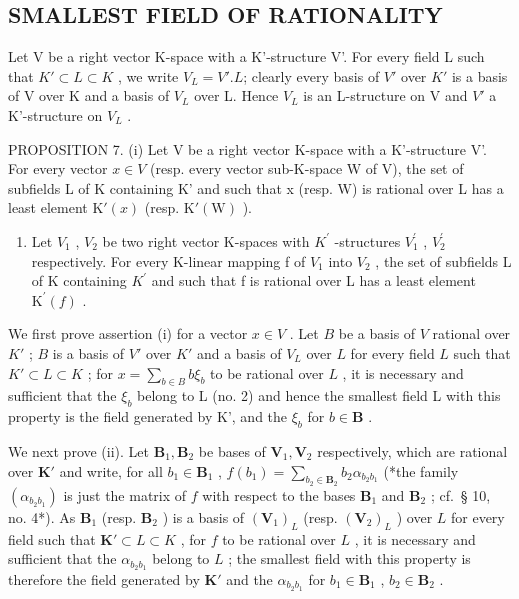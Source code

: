 \subsection{SMALLEST FIELD OF RATIONALITY}

Let V be a right vector K-space with a K'-structure V'. For every field L such that \(K' \subset L \subset K\) , we write \(V_{L} = V'. L\); clearly every basis of \(V'\) over \(K'\) is a basis of V over K and a basis of \(V_{L}\) over L. Hence \(V_{L}\) is an L-structure on V and \(V'\) a K'-structure on \(V_{L}\) .

PROPOSITION 7. (i) Let V be a right vector K-space with a K'-structure V'. For every vector \(x \in V\) (resp. every vector sub-K-space W of V), the set of subfields L of K containing K' and such that x (resp. W) is rational over L has a least element \(\mathrm{K}'(x)\) (resp. \(\mathrm{K}'(\mathrm{W})\) ).

\begin{enumerate}
\def\labelenumi{(\roman{enumi})}
\setcounter{enumi}{1}
\tightlist
\item
  Let \(V_{1}\) , \(V_{2}\) be two right vector K-spaces with \(K^{\prime}\) -structures \(V_{1}^{\prime}\) , \(V_{2}^{\prime}\) respectively. For every K-linear mapping f of \(V_{1}\) into \(V_{2}\) , the set of subfields L of K containing \(K^{\prime}\) and such that f is rational over L has a least element \(\mathrm{K}^{\prime}(f)\) .
\end{enumerate}

We first prove assertion (i) for a vector \(x \in V\) . Let \(B\) be a basis of \(V\) rational over \(K'\) ; \(B\) is a basis of \(V'\) over \(K'\) and a basis of \(V_L\) over \(L\) for every field \(L\) such that \(K' \subset L \subset K\) ; for \(x = \sum_{b \in B} b\xi_b\) to be rational over \(L\) , it is necessary and sufficient that the \(\xi_{b}\) belong to L (no. 2) and hence the smallest field L with this property is the field generated by K', and the \(\xi_{b}\) for \(b \in \mathbf{B}\) .

We next prove (ii). Let \(\mathbf{B}_1, \mathbf{B}_2\) be bases of \(\mathbf{V}_1, \mathbf{V}_2\) respectively, which are rational over \(\mathbf{K}'\) and write, for all \(b_1 \in \mathbf{B}_1\) , \(f(b_1) = \sum_{b_2 \in \mathbf{B}_2} b_2 \alpha_{b_2 b_1}\) (*the family \((\alpha_{b_2 b_1})\) is just the matrix of \(f\) with respect to the bases \(\mathbf{B}_1\) and \(\mathbf{B}_2\) ; cf.~§ 10, no. 4*). As \(\mathbf{B}_1\) (resp. \(\mathbf{B}_2\) ) is a basis of \((\mathbf{V}_1)_L\) (resp. \((\mathbf{V}_2)_L\) ) over \(L\) for every field such that \(\mathbf{K}' \subset L \subset K\) , for \(f\) to be rational over \(L\) , it is necessary and sufficient that the \(\alpha_{b_2 b_1}\) belong to \(L\) ; the smallest field with this property is therefore the field generated by \(\mathbf{K}'\) and the \(\alpha_{b_2 b_1}\) for \(b_1 \in \mathbf{B}_1\) , \(b_2 \in \mathbf{B}_2\) .

